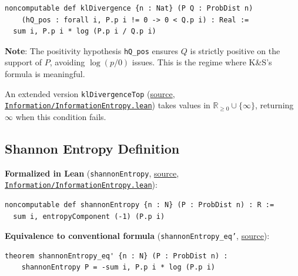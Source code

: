 \documentclass[11pt]{article}
\theoremstyle{definition}
\theoremstyle{remark}
\begin{document}
\begin{lstlisting}[caption={\texttt{klDivergence} (\href{https://github.com/zariuq/ks-foundations-of-inference/blob/main/KnuthSkilling/Information/InformationEntropy.lean}{Information/InformationEntropy.lean})},numbers=none]
noncomputable def klDivergence {n : Nat} (P Q : ProbDist n)
    (hQ_pos : forall i, P.p i != 0 -> 0 < Q.p i) : Real :=
  sum i, P.p i * log (P.p i / Q.p i)
\end{lstlisting}

\textbf{Note}: The positivity hypothesis \texttt{hQ\_pos} ensures $Q$ is strictly positive on the support of $P$,
avoiding $\log(p/0)$ issues. This is the regime where K\&S's formula is meaningful.

An extended version \texttt{klDivergenceTop} (\href{https://github.com/zariuq/ks-foundations-of-inference/blob/main/KnuthSkilling/Information/InformationEntropy.lean}{source}, \href{https://github.com/zariuq/ks-foundations-of-inference/blob/main/KnuthSkilling/Information/InformationEntropy.lean}{\texttt{Information/InformationEntropy.lean}}) takes values in
$\mathbb{R}_{\geq 0} \cup \{\infty\}$, returning $\infty$ when this condition fails.

\subsection{Shannon Entropy Definition}

\textbf{Formalized in Lean} (\texttt{shannonEntropy}, \href{https://github.com/zariuq/ks-foundations-of-inference/blob/main/KnuthSkilling/Information/InformationEntropy.lean}{source}, \href{https://github.com/zariuq/ks-foundations-of-inference/blob/main/KnuthSkilling/Information/InformationEntropy.lean}{\texttt{Information/InformationEntropy.lean}}):
\begin{lstlisting}[caption={Shannon entropy from the variational framework},numbers=none]
noncomputable def shannonEntropy {n : N} (P : ProbDist n) : R :=
  sum i, entropyComponent (-1) (P.p i)
\end{lstlisting}

\textbf{Equivalence to conventional formula} (\texttt{shannonEntropy\_eq'}, \href{https://github.com/zariuq/ks-foundations-of-inference/blob/main/KnuthSkilling/Information/InformationEntropy.lean}{source}):
\begin{lstlisting}[caption={Shannon entropy equals $-\sum p_k \log p_k$},numbers=none]
theorem shannonEntropy_eq' {n : N} (P : ProbDist n) :
    shannonEntropy P = -sum i, P.p i * log (P.p i)
\end{lstlisting}
\end{document}
